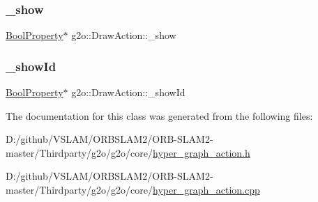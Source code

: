 \subsubsection{\texorpdfstring{\+\_\+show}{\_show}}
{\footnotesize\ttfamily \mbox{\hyperlink{namespaceg2o_a28e624fedcafeb2b049be2930421071f}{Bool\+Property}}$\ast$ g2o\+::\+Draw\+Action\+::\+\_\+show\hspace{0.3cm}{\ttfamily [protected]}}

\mbox{\label{classg2o_1_1_draw_action_ab5f870bf2a931e64bc994c87c4212ad3}} 
\subsubsection{\texorpdfstring{\+\_\+show\+Id}{\_showId}}
{\footnotesize\ttfamily \mbox{\hyperlink{namespaceg2o_a28e624fedcafeb2b049be2930421071f}{Bool\+Property}}$\ast$ g2o\+::\+Draw\+Action\+::\+\_\+show\+Id\hspace{0.3cm}{\ttfamily [protected]}}



The documentation for this class was generated from the following files\+:\begin{DoxyCompactItemize}
\item 
D\+:/github/\+V\+S\+L\+A\+M/\+O\+R\+B\+S\+L\+A\+M2/\+O\+R\+B-\/\+S\+L\+A\+M2-\/master/\+Thirdparty/g2o/g2o/core/\mbox{\hyperlink{hyper__graph__action_8h}{hyper\+\_\+graph\+\_\+action.\+h}}\item 
D\+:/github/\+V\+S\+L\+A\+M/\+O\+R\+B\+S\+L\+A\+M2/\+O\+R\+B-\/\+S\+L\+A\+M2-\/master/\+Thirdparty/g2o/g2o/core/\mbox{\hyperlink{hyper__graph__action_8cpp}{hyper\+\_\+graph\+\_\+action.\+cpp}}\end{DoxyCompactItemize}
